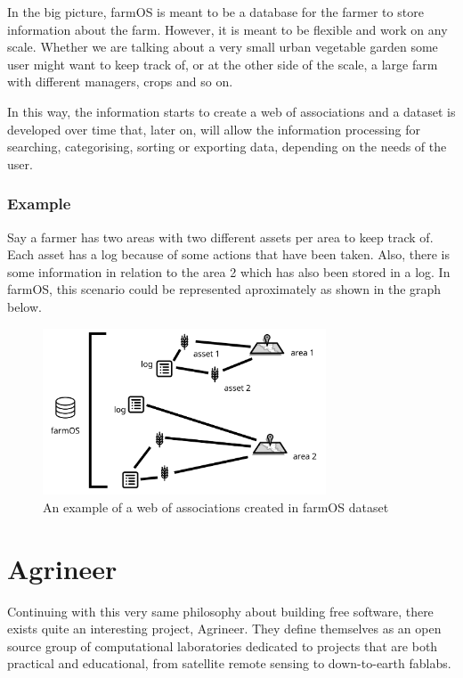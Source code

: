 In the big picture, farmOS is meant to be a database for the farmer to store information about the farm. However, it is meant to be flexible and work on any scale. Whether we are talking about a very small urban vegetable garden some user might want to keep track of, or at the other side of the scale, a large farm with different managers, crops and so on.

In this way, the information starts to create a web of associations and a dataset is developed over time that, later on, will allow the information processing for searching, categorising, sorting or exporting data, depending on the needs of the user. 


\subsubsection*{Example}

Say a farmer has two areas with two different assets per area to keep track of. Each asset has a log because of some actions that have been taken. Also, there is some information in relation to the area 2 which has also been stored in a log. In farmOS, this scenario could be represented aproximately as shown in the graph below.

\begin{figure}[htp]
    \centering
    \includegraphics[width=0.75\textwidth]{fig/farmos-structure.png}
    \caption{An example of a web of associations created in farmOS dataset}
    \label{fig:farmos01}
\end{figure}


\section{Agrineer}
Continuing with this very same philosophy about building free software, there exists quite an interesting project, Agrineer. They define themselves as an open source group of computational laboratories dedicated to projects that are both practical and educational, from satellite remote sensing to down-to-earth fablabs\cite{agrineer}.


